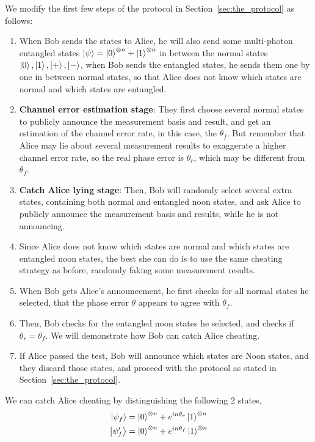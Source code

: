 \documentclass[%
 reprint,
superscriptaddress,
 amsmath,amssymb,
 aps,
]{revtex4-2}
\begin{document}
We modify the first few steps of the protocol in Section~\ref{sec:the_protocol} as follows: 
\begin{enumerate}
    \item When Bob sends the states to Alice, he will also send some multi-photon entangled states $\ket{\psi}=\ket{0}^{\otimes n}+\ket{1}^{\otimes n}$ in between the normal states $\ket{0}, \ket{1}, \ket{+}, \ket{-}$, when Bob sends the entangled states, he sends them one by one in between normal states, so that Alice does not know which states are normal and which states are entangled.
    
    \item \textbf{Channel error estimation stage}: They first choose several normal states to publicly announce the measurement basis and result, and get an estimation of the channel error rate, in this case, the $\theta_f$. But remember that Alice may lie about several measurement results to exaggerate a higher channel error rate, so the real phase error is $\theta_r$, which may be different from $\theta_f$.

    \item \textbf{Catch Alice lying stage}: Then, Bob will randomly select several extra states, containing both normal and entangled noon states, and ask Alice to publicly announce the measurement basis and results, while he is not announcing. 

    \item Since Alice does not know which states are normal and which states are entangled noon states, the best she can do is to use the same cheating strategy as before, randomly faking some measurement results.

    \item When Bob gets Alice's announcement, he first checks for all normal states he selected, that the phase error $\theta$ appears to agree with $\theta_f$.

    \item Then, Bob checks for the entangled noon states he selected, and checks if $\theta_r=\theta_f$. We will demonstrate how Bob can catch Alice cheating.

    \item If Alice passed the test, Bob will announce which states are Noon states, and they discard those states, and proceed with the protocol as stated in Section~\ref{sec:the_protocol}.
\end{enumerate}

We can catch Alice cheating by distinguishing the following 2 states,
\begin{equation}
\begin{split}
\ket{\psi_{f}}&=\ket{0}^{\otimes n}+e^{in\theta_r}\ket{1}^{\otimes n}\\
\ket{\psi_{f}'}&=\ket{0}^{\otimes n}+e^{in\theta_f}\ket{1}^{\otimes n}
\end{split}
\end{equation}
\end{document}
